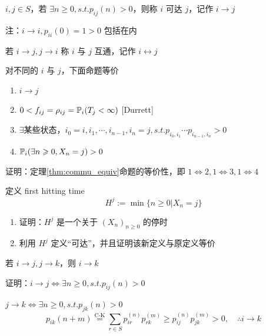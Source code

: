 \begin{definition}[可达]
    $i,j\in S$，若 $\exists n\geq 0, s.t.p_{ij}(n)>0$，则称 $i$ 可达 $j$，记作 $i\to j$

    注：$i\to i,p_{ii}(0)=1>0$ 包括在内
\end{definition}

\begin{definition}[互通]
    若 $i\to j,j\to i$ 称 $i$ 与 $j$ 互通，记作 $i\leftrightarrow j$
\end{definition}

\begin{theorem}\label{thm:commu_equiv}
    对不同的 $i$ 与 $j$，下面命题等价
    \begin{enumerate}
        \item $i\to j$
        \item $0<f_{ij}=\rho_{ij}=\mathbb{P}_i(T_j<\infty)$ [Durrett\cite{durrett}]
        \item $\exists$某些状态，$i_0=i,i_1,\cdots,i_{n-1},i_n=j,s.t.p_{i_0,i_1}\cdots p_{i_{n-1},i_n}>0$
        \item $\mathbb{P}_i(\exists n\geqslant 0,X_n=j)>0$
    \end{enumerate}
\end{theorem}

\begin{problem}[作业6-1]
    证明：定理\ref{thm:commu_equiv}命题的等价性，即 $1\Leftrightarrow 2,1\Leftrightarrow 3, 1\Leftrightarrow 4$
\end{problem}

\begin{problem}[作业6-2]
    定义 first hitting time
    \[
    H^j:=\min\{n\geq 0|X_n=j\}
    \]
    \begin{enumerate}
        \item 证明：$H^j$ 是一个关于 $(X_n)_{n\geq 0}$ 的停时
        \item 利用 $H^j$ 定义“可达”，并且证明该新定义与原定义等价
    \end{enumerate}
\end{problem}

\begin{property}
    若 $i\to j,j\to k$，则 $i\to k$
\end{property}

证明：$i\to j\Leftrightarrow\exists n\geq 0,s.t. p_{ij}(n)>0$

$j\to k\Leftrightarrow\exists n\geq 0,s.t. p_{jk}(n)>0$
\[
p_{ik}(n+m)\overset{\text{C-K}}{=}\sum_{r\in S}p_{ir}^{(n)}p_{rk}^{(m)}\geq p_{ij}^{(n)}p_{jk}^{(m)}>0,\quad \therefore i\to k
\]

